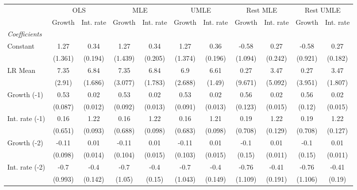 \begin{table}[htbp] 
	\centering
	\begin{tabular}{@{\extracolsep{4pt}}lcccccccccc@{}}		\hline\hline
		 		 & \multicolumn{2}{c}{OLS} &\multicolumn{2}{c}{MLE} &\multicolumn{2}{c}{UMLE} &\multicolumn{2}{c}{Rest MLE} &\multicolumn{2}{c}{Rest UMLE} \\ 
 		 & Growth 	 & Int. rate 	 & Growth 	 & Int. rate 	 & Growth 	 & Int. rate 	 & Growth 	 & Int. rate 	 & Growth 	 & Int. rate\\\cline{2-3}\cline{4-5}\cline{6-7}\cline{8-9}\cline{10-11}
\rule{0pt}{4ex} 
 \emph{Coefficients} 	  		 & 		 & 		 & 		 & 		 & 		 & 		 & 		 & 		 & 		 &\\ 
\quad Constant 	 & 1.27 	 & 0.34 	 & 1.27 	 & 0.34 	 & 1.27 	 & 0.36 	 & -0.58 	 & 0.27 	 & -0.58 	 & 0.27	 \\ 
 		 & (1.361) 	 & (0.194) 	 & (1.439) 	 & (0.205) 	 & (1.374) 	 & (0.196) 	 & (1.094) 	 & (0.242) 	 & (0.921) 	 & (0.182) 	 \\ 
\quad LR Mean 	 & 7.35 	 & 6.84 	 & 7.35 	 & 6.84 	 & 6.9 	 & 6.61 	 & 0.27 	 & 3.47 	 & 0.27 	 & 3.47	 \\ 
 		 & (2.91) 	 & (1.686) 	 & (3.077) 	 & (1.783) 	 & (2.688) 	 & (1.49) 	 & (9.671) 	 & (5.092) 	 & (3.951) 	 & (1.807) 	 \\ 
\quad Growth (-1) 	 &0.53 	 & 0.02 	 & 0.53 	 & 0.02 	 & 0.53 	 & 0.02 	 & 0.56 	 & 0.02 	 & 0.56 	 & 0.02	 \\ 
 		 & (0.087) 	 & (0.012) 	 & (0.092) 	 & (0.013) 	 & (0.091) 	 & (0.013) 	 & (0.123) 	 & (0.015) 	 & (0.12) 	 & (0.015) 	 \\ 
\quad Int. rate (-1) 	 &0.16 	 & 1.22 	 & 0.16 	 & 1.22 	 & 0.16 	 & 1.21 	 & 0.19 	 & 1.22 	 & 0.19 	 & 1.22	 \\ 
 		 & (0.651) 	 & (0.093) 	 & (0.688) 	 & (0.098) 	 & (0.683) 	 & (0.098) 	 & (0.708) 	 & (0.129) 	 & (0.708) 	 & (0.127) 	 \\ 
\quad Growth (-2) 	 &-0.11 	 & 0.01 	 & -0.11 	 & 0.01 	 & -0.11 	 & 0.01 	 & -0.1 	 & 0.01 	 & -0.1 	 & 0.01	 \\ 
 		 & (0.098) 	 & (0.014) 	 & (0.104) 	 & (0.015) 	 & (0.103) 	 & (0.015) 	 & (0.15) 	 & (0.011) 	 & (0.15) 	 & (0.011) 	 \\ 
\quad Int. rate (-2) 	 &-0.7 	 & -0.4 	 & -0.7 	 & -0.4 	 & -0.7 	 & -0.4 	 & -0.76 	 & -0.41 	 & -0.76 	 & -0.41	 \\ 
 		 & (0.993) 	 & (0.142) 	 & (1.05) 	 & (0.15) 	 & (1.043) 	 & (0.149) 	 & (1.109) 	 & (0.191) 	 & (1.106) 	 & (0.19) 	 \\ 

\end{tabular}
\end{table}
